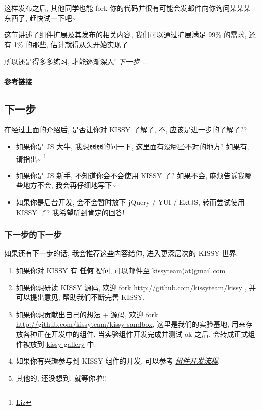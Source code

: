 \documentclass[letterpaper,10pt,english]{sphinxmanual}
\begin{document}
这样发布之后, 其他同学也能 fork 你的代码并很有可能会发邮件向你询问某某某东西了, 赶快试一下吧\textasciitilde{}

这节讲述了组件扩展及其发布的相关内容, 我们可以通过扩展满足 99\% 的需求, 还有 1\% 的那些, 估计就得从头开始实现了.

所以还是得多多练习, 才能逐渐深入! {\hyperref[quickstart/nextstep:quickstart-nextstep]{\emph{下一步}}} ...
\paragraph{参考链接}


\subsection{下一步}
\label{quickstart/nextstep:quickstart-nextstep}\label{quickstart/nextstep::doc}\label{quickstart/nextstep:id1}
在经过上面的介绍后, 是否让你对 KISSY 了解了, 不, 应该是进一步的了解了??
\begin{itemize}
\item {}
如果你是 JS 大牛, 我想弱弱的问一下, 这里面有没哪些不对的地方? 如果有, 请指出\textasciitilde{} \footnote{
\href{mailto:shengyan1985@gmail.com}{Liz}
}

\item {}
如果你是 JS 新手, 不知道你会不会使用 KISSY 了? 如果不会, 麻烦告诉我哪些地方不会, 我会再仔细地写下\textasciitilde{}

\item {}
如果你是后台开发, 会不会暂时放下 jQuery / YUI / ExtJS, 转而尝试使用 KISSY 了?  我希望听到肯定的回答!

\end{itemize}


\subsubsection{下一步的下一步}
\label{quickstart/nextstep:id3}
如果还有下一步的话, 我会推荐这些内容给你, 进入更深层次的 KISSY 世界:
\begin{enumerate}
\item {}
如果你对 KISSY 有 \textbf{任何} 疑问, 可以邮件至 \href{mailto:kissyteam(at)gmail.com}{kissyteam(at)gmail.com}

\item {}
如果你想研读 KISSY 源码, 欢迎 fork \href{http://github.com/kissyteam/kissy}{http://github.com/kissyteam/kissy} , 并可以提出意见, 帮助我们不断完善 KISSY.

\item {}
如果你想贡献出自己的想法 + 源码, 欢迎 fork \href{http://github.com/kissyteam/kissy-sandbox}{http://github.com/kissyteam/kissy-sandbox}, 这里是我们的实验基地, 用来存放各种正在开发中的组件, 当实验组件开发完成并测试 ok 之后, 会转成正式组件被放到  \href{http://github.com/kissyteam/kissy-gallery}{kissy-gallery} 中.

\item {}
如果你有兴趣参与到 KISSY 组件的开发, 可以参考 {\hyperref[workflow/index:workflow]{\emph{组件开发流程}}}.

\item {}
其他的, 还没想到, 就等你啦!!

\end{enumerate}
\end{document}
